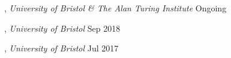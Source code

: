 
, \textit{University of Bristol \& The Alan Turing Institute} \hfill	Ongoing

, \textit{University of Bristol}	\hfill Sep 2018

, \textit{University of Bristol} \hfill	Jul 2017




